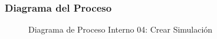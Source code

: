 \subsubsection{Diagrama del Proceso}
\begin{figure}[H]
    \centering
        \caption{Diagrama de Proceso Interno 04: Crear Simulación}%
    \label{fig:process_diagram04}
\end{figure}
\newpage